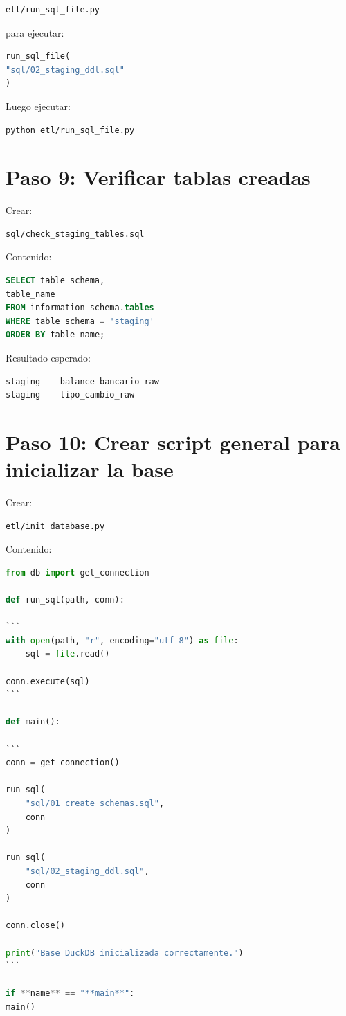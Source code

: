 \begin{verbatim}
etl/run_sql_file.py
\end{verbatim}

para ejecutar:

\begin{lstlisting}[language=Python]
run_sql_file(
"sql/02_staging_ddl.sql"
)
\end{lstlisting}

Luego ejecutar:

\begin{lstlisting}[language=bash]
python etl/run_sql_file.py
\end{lstlisting}

\section{Paso 9: Verificar tablas creadas}

Crear:

\begin{verbatim}
sql/check_staging_tables.sql
\end{verbatim}

Contenido:

\begin{lstlisting}[language=SQL]
SELECT table_schema,
table_name
FROM information_schema.tables
WHERE table_schema = 'staging'
ORDER BY table_name;
\end{lstlisting}

Resultado esperado:

\begin{verbatim}
staging    balance_bancario_raw
staging    tipo_cambio_raw
\end{verbatim}

\section{Paso 10: Crear script general para inicializar la base}

Crear:

\begin{verbatim}
etl/init_database.py
\end{verbatim}

Contenido:

\begin{lstlisting}[language=Python]
from db import get_connection

def run_sql(path, conn):

```
with open(path, "r", encoding="utf-8") as file:
    sql = file.read()

conn.execute(sql)
```

def main():

```
conn = get_connection()

run_sql(
    "sql/01_create_schemas.sql",
    conn
)

run_sql(
    "sql/02_staging_ddl.sql",
    conn
)

conn.close()

print("Base DuckDB inicializada correctamente.")
```

if **name** == "**main**":
main()
\end{lstlisting}


